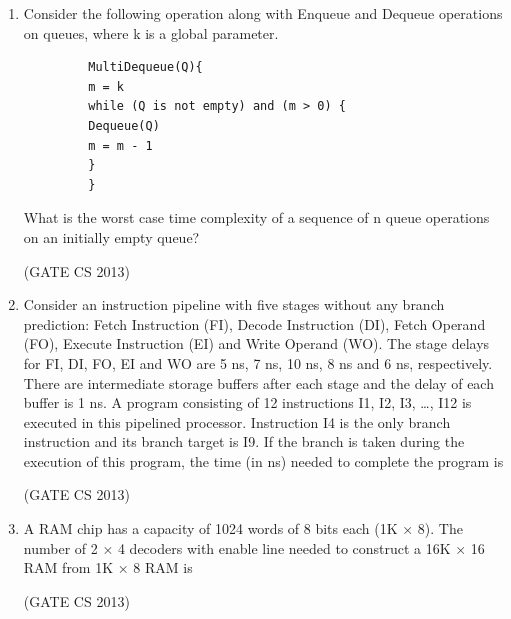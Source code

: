 \documentclass[a4paper, 11pt]{article}
\begin{document}
\begin{enumerate}
     \item Consider the following operation along with Enqueue and Dequeue operations on queues, where k is a global parameter.
     \begin{lstlisting}
         MultiDequeue(Q){
         m = k
         while (Q is not empty) and (m > 0) {
         Dequeue(Q)
         m = m - 1
         }
         }
     \end{lstlisting}
     What is the worst case time complexity of a sequence of n queue operations on an initially empty queue?
     \begin{enumerate}
     \end{enumerate}
     \hfill (GATE CS 2013)

     \item Consider an instruction pipeline with five stages without any branch prediction: Fetch Instruction (FI), Decode Instruction (DI), Fetch Operand (FO), Execute Instruction (EI) and Write Operand (WO). The stage delays for FI, DI, FO, EI and WO are 5 ns, 7 ns, 10 ns, 8 ns and 6 ns, respectively. There are intermediate storage buffers after each stage and the delay of each buffer is 1 ns. A program consisting of 12 instructions I1, I2, I3, …, I12 is executed in this pipelined processor. Instruction I4 is the only branch instruction and its branch target is I9. If the branch is taken during the execution of this program, the time (in ns) needed to complete the program is
     \begin{enumerate}
     \end{enumerate}
     \hfill (GATE CS 2013)
     \item A RAM chip has a capacity of 1024 words of 8 bits each (1K × 8). The number of 2 × 4 decoders with enable line needed to construct a 16K × 16 RAM from 1K × 8 RAM is 
     \begin{enumerate}
     \end{enumerate}
     \hfill (GATE CS 2013)


\end{enumerate}
\end{document}
